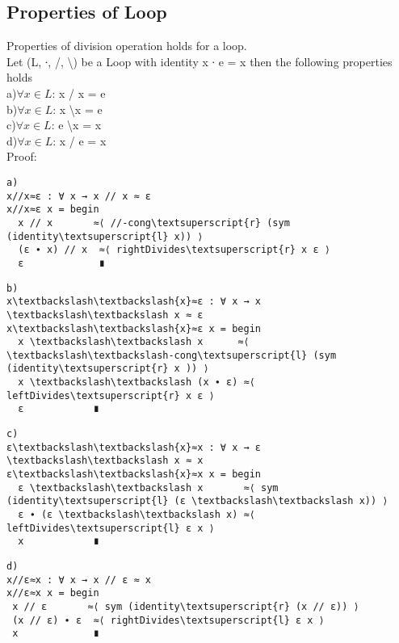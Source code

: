 \subsection{Properties of Loop}
Properties of division operation holds for a loop. \\
Let (L, ∙, /, \textbackslash ) be a Loop with identity x ∙ e = x then the following properties holds \\
a)\(\forall x \in L\): x / x = e \\
b)\(\forall x \in L\):  x \textbackslash x = e\\
c)\(\forall x \in L\): e \textbackslash x = x \\
d)\(\forall x \in L\):  x / e = x \\
Proof:

\begin{Verbatim}[commandchars=\\\{\},samepage=true]
a)
x//x≈ε : ∀ x → x // x ≈ ε
x//x≈ε x = begin
  x // x       ≈⟨ //-cong\textsuperscript{r} (sym (identity\textsuperscript{l} x)) ⟩
  (ε ∙ x) // x  ≈⟨ rightDivides\textsuperscript{r} x ε ⟩
  ε             ∎
\end{Verbatim}

\begin{Verbatim}[commandchars=\\\{\},samepage=true]
b)
x\textbackslash\textbackslash{x}≈ε : ∀ x → x \textbackslash\textbackslash x ≈ ε
x\textbackslash\textbackslash{x}≈ε x = begin
  x \textbackslash\textbackslash x      ≈⟨ \textbackslash\textbackslash-cong\textsuperscript{l} (sym (identity\textsuperscript{r} x )) ⟩
  x \textbackslash\textbackslash (x ∙ ε) ≈⟨ leftDivides\textsuperscript{r} x ε ⟩
  ε            ∎
\end{Verbatim}
\begin{Verbatim}[commandchars=\\\{\},samepage=true]
c)
ε\textbackslash\textbackslash{x}≈x : ∀ x → ε \textbackslash\textbackslash x ≈ x
ε\textbackslash\textbackslash{x}≈x x = begin
  ε \textbackslash\textbackslash x       ≈⟨ sym (identity\textsuperscript{l} (ε \textbackslash\textbackslash x)) ⟩
  ε ∙ (ε \textbackslash\textbackslash x) ≈⟨ leftDivides\textsuperscript{l} ε x ⟩
  x            ∎
\end{Verbatim}

\begin{Verbatim}[commandchars=\\\{\},samepage=true]
d)
x//ε≈x : ∀ x → x // ε ≈ x
x//ε≈x x = begin
 x // ε       ≈⟨ sym (identity\textsuperscript{r} (x // ε)) ⟩
 (x // ε) ∙ ε  ≈⟨ rightDivides\textsuperscript{l} ε x ⟩
 x             ∎

\end{Verbatim}
